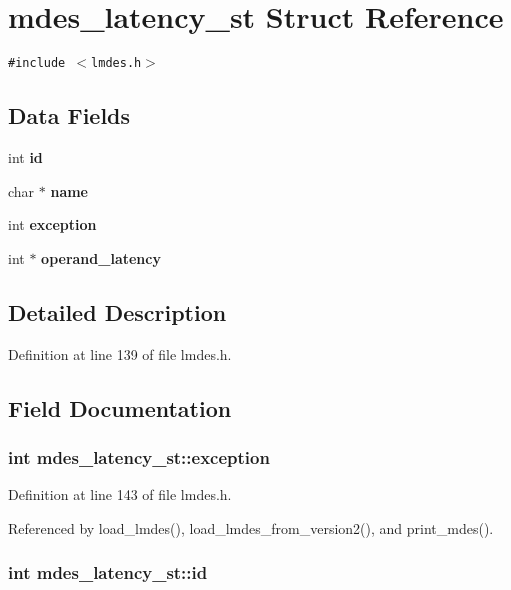 \section{mdes\_\-latency\_\-st Struct Reference}
\label{structmdes__latency__st}
{\tt \#include $<$lmdes.h$>$}

\subsection*{Data Fields}
\begin{CompactItemize}
\item 
int \bf{id}
\item 
char $\ast$ \bf{name}
\item 
int \bf{exception}
\item 
int $\ast$ \bf{operand\_\-latency}
\end{CompactItemize}


\subsection{Detailed Description}




Definition at line 139 of file lmdes.h.

\subsection{Field Documentation}
\subsubsection{\setlength{\rightskip}{0pt plus 5cm}int \bf{mdes\_\-latency\_\-st::exception}}\label{structmdes__latency__st_d6bf7453d6437b4e2cf10ff5bfb9b684}




Definition at line 143 of file lmdes.h.

Referenced by load\_\-lmdes(), load\_\-lmdes\_\-from\_\-version2(), and print\_\-mdes().
\subsubsection{\setlength{\rightskip}{0pt plus 5cm}int \bf{mdes\_\-latency\_\-st::id}}\label{structmdes__latency__st_d60adbae92e6ce9d28d33d135210d853}




